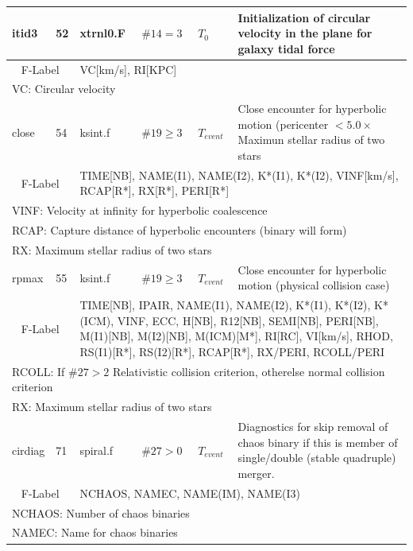 \begin{longtable}{||p{0.42in}|p{0.25in}|p{0.6in}|p{0.6in}|p{0.4in}|p{2.3in}||}
  itid3     & 52  & xtrnl0.F   & $\#14=3$ &  $T_0$     & Initialization of circular velocity in the plane for galaxy tidal force \\\hline
\multicolumn{2}{|c|}{ F-Label } & \multicolumn{4}{|p{4.4in}|}{ VC[km/s], RI[KPC] } \\\hline
\multicolumn{6}{|p{5.4in}|}{ VC: Circular velocity } \\\hline\hline

  close     & 54  & ksint.f    & $\#19\geq3$  & $T_{event}$    & Close encounter for hyperbolic motion (pericenter $< 5.0 \times$ Maximun stellar radius of two stars \\\hline
\multicolumn{2}{|c|}{ F-Label } & \multicolumn{4}{|p{4.4in}|}{TIME[NB], NAME(I1), NAME(I2), K*(I1), K*(I2), VINF[km/s], RCAP[R*], RX[R*], PERI[R*] }\\\hline
\multicolumn{6}{|p{5.4in}|}{ VINF: Velocity at infinity for hyperbolic coalescence }\\
\multicolumn{6}{|p{5.4in}|}{ RCAP: Capture distance of hyperbolic encounters (binary will form)} \\
\multicolumn{6}{|p{5.4in}|}{ RX: Maximum stellar radius of two stars} \\\hline\hline

  rpmax     & 55  & ksint.f    & $\#19\geq3$  & $T_{event}$    & Close encounter for hyperbolic motion (physical collision case) \\\hline
\multicolumn{2}{|c|}{ F-Label } & \multicolumn{4}{|p{4.4in}|}{TIME[NB], IPAIR, NAME(I1), NAME(I2), K*(I1), K*(I2), K*(ICM), VINF, ECC, H[NB], R12[NB], SEMI[NB], PERI[NB], M(I1)[NB], M(I2)[NB], M(ICM)[M*], RI[RC], VI[km/s], RHOD, RS(I1)[R*], RS(I2)[R*], RCAP[R*], RX/PERI, RCOLL/PERI} \\\hline
\multicolumn{6}{|p{5.4in}|}{ RCOLL: If $\#27>2$ Relativistic collision criterion, otherelse normal collision criterion} \\
\multicolumn{6}{|p{5.4in}|}{ RX: Maximum stellar radius of two stars} \\\hline\hline


 cirdiag     & 71  & spiral.f   & $\#27>0$   & $T_{event}$    & Diagnostics for skip removal of chaos binary if this is member of single/double (stable quadruple) merger. \\\hline
\multicolumn{2}{|c|}{ F-Label } & \multicolumn{4}{|p{4.4in}|}{ NCHAOS, NAMEC, NAME(IM), NAME(I3) }\\
\multicolumn{6}{|p{5.4in}|}{ NCHAOS:  Number of chaos binaries }\\
\multicolumn{6}{|p{5.4in}|}{ NAMEC:  Name for chaos binaries }\\
\hline\hline


\end{longtable}
